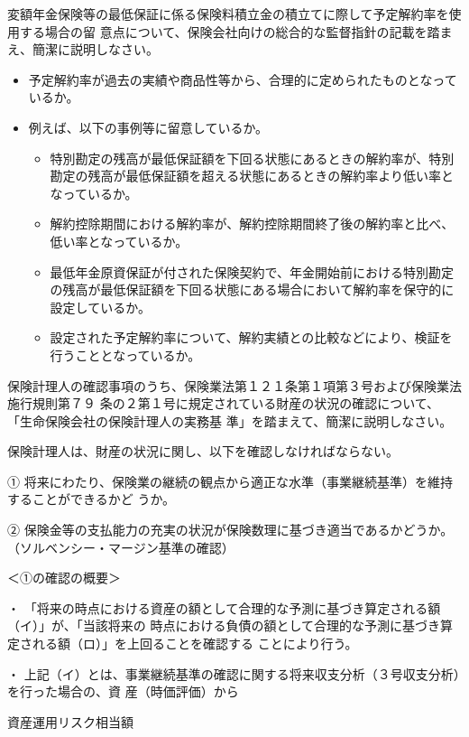 \documentclass[report,gutter=10mm,fore-edge=10mm,uplatex,dvipdfmx]{jlreq}
\begin{document}
変額年金保険等の最低保証に係る保険料積立金の積立てに際して予定解約率を使用する場合の留
意点について、保険会社向けの総合的な監督指針の記載を踏まえ、簡潔に説明しなさい。

\answer{}
\begin{itemize}
\item[]  予定解約率が過去の実績や商品性等から、合理的に定められたものとなっているか。
\item[]  例えば、以下の事例等に留意しているか。
\begin{itemize}
\item[]  特別勘定の残高が最低保証額を下回る状態にあるときの解約率が、特別勘定の残高が最低保証額を超える状態にあるときの解約率より低い率となっているか。
\item[]  解約控除期間における解約率が、解約控除期間終了後の解約率と比べ、低い率となっているか。
\item[]  最低年金原資保証が付された保険契約で、年金開始前における特別勘定の残高が最低保証額を下回る状態にある場合において解約率を保守的に設定しているか。
\item[]  設定された予定解約率について、解約実績との比較などにより、検証を行うこととなっているか。
\end{itemize}
\end{itemize}

保険計理人の確認事項のうち、保険業法第１２１条第１項第３号および保険業法施行規則第７９
条の２第１号に規定されている財産の状況の確認について、
「生命保険会社の保険計理人の実務基
準」を踏まえて、簡潔に説明しなさい。

\answer{}
保険計理人は、財産の状況に関し、以下を確認しなければならない。

① 将来にわたり、保険業の継続の観点から適正な水準（事業継続基準）を維持することができるかど
うか。

② 保険金等の支払能力の充実の状況が保険数理に基づき適当であるかどうか。
（ソルベンシー・マージン基準の確認）

＜①の確認の概要＞

・ 「将来の時点における資産の額として合理的な予測に基づき算定される額（イ）」が、「当該将来の
時点における負債の額として合理的な予測に基づき算定される額（ロ）」を上回ることを確認する
ことにより行う。

・ 上記（イ）とは、事業継続基準の確認に関する将来収支分析（３号収支分析）を行った場合の、資
産（時価評価）から

資産運用リスク相当額
\end{document}

